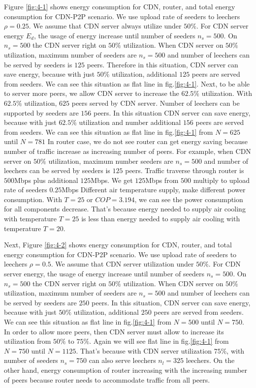 Figure \ref{fig:4-1} shows energy consumption for CDN, router, and total energy consumption for CDN-P2P scenario.
We use upload rate of seeders to leechers $\rho=0.25$.
We assume that CDN server always utilize under $50\%$.
For CDN server energy $E_d$, the usage of energy increase until number of seeders $n_s=500$.
On $n_s=500$ the CDN server right on $50\%$ utilization.
When CDN server on $50\%$ utilization, maximum number of seeders are $n_s=500$ and number of leechers can be served by seeders is $125$ peers.  
Therefore in this situation, CDN server can save energy, because with just $50\%$ utilization, additional $125$ peers are served from seeders.  
We can see this situation as flat line in fig.\ref{fig:4-1}.
Next, to be able to server more peers, we allow CDN server to increase the $62.5\%$ utilization.
With $62.5\%$ utilization, $625$ peers served by CDN server. 
Number of leechers can be supported by seeders are $156$ peers.
In this situation CDN server can save energy, because with just $62.5\%$ utilization and number additional $156$ peers are served from seeders.  
We can see this situation as flat line in fig.\ref{fig:4-1} from $N=625$ until $N=781$
In router case, we do not see router can get energy saving because number of traffic increase as increasing number of peers. 
For example, when CDN server on $50\%$ utilization, maximum number seeders are $n_s=500$ and number of leechers can be served by seeders is $125$ peers.
Traffic traverse through router is $500$Mbps plus additional $125$Mbps. 
We get $125$Mbps from $500$ multiply to upload rate of seeders $0.25$Mbps
Different air temperature supply, make different power consumption.  
With $T=25$ or $COP=3.194$, we can see the power consumption for all components decrease.
That's because energy needed to supply air cooling with temperature $T=25$ is less than  energy needed to supply air cooling with temperature $T=20$.

Next, Figure \ref{fig:4-2} shows energy consumption for CDN, router, and total energy consumption for CDN-P2P scenario.
We use upload rate of seeders to leechers $\rho=0.5$.
We assume that CDN server utilization under $50\%$.
For CDN server energy, the usage of energy increase until number of seeders $n_s=500$.
On $n_s=500$ the CDN server right on $50\%$ utilization.
When CDN server on $50\%$ utilization, maximum number of seeders are $n_s=500$ and number of leechers can be served by seeders are $250$ peers.
In this situation, CDN server can save energy, because with just $50\%$ utilization, additional $250$ peers are served from seeders. 
We can see this situation as flat line in fig.\ref{fig:4-1} from $N=500$ until $N=750$.
In order to allow more peers, then CDN server must allow to increase its utilization from $50\%$ to $75\%$.
Again we will see flat line in fig.\ref{fig:4-1} from $N=750$ until $N=1125$. 
That's because with CDN server utilization $75\%$, with number of seeders $n_s=750$ can also serve leechers $n_l=325$ leechers.
On the other hand, energy consumption of router increasing with the increasing number of peers because router needs to accommodate traffic from all peers. 

